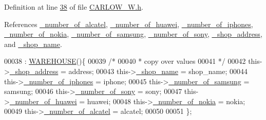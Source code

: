 Definition at line \hyperlink{_c_a_r_l_o_w___w_8h_source_l00038}{38} of file \hyperlink{_c_a_r_l_o_w___w_8h_source}{C\+A\+R\+L\+O\+W\+\_\+\+W.\+h}.



References \hyperlink{_c_a_r_l_o_w___w_8h_source_l00116}{\+\_\+number\+\_\+of\+\_\+alcatel}, \hyperlink{_c_a_r_l_o_w___w_8h_source_l00114}{\+\_\+number\+\_\+of\+\_\+huawei}, \hyperlink{_c_a_r_l_o_w___w_8h_source_l00111}{\+\_\+number\+\_\+of\+\_\+iphones}, \hyperlink{_c_a_r_l_o_w___w_8h_source_l00115}{\+\_\+number\+\_\+of\+\_\+nokia}, \hyperlink{_c_a_r_l_o_w___w_8h_source_l00112}{\+\_\+number\+\_\+of\+\_\+samsung}, \hyperlink{_c_a_r_l_o_w___w_8h_source_l00113}{\+\_\+number\+\_\+of\+\_\+sony}, \hyperlink{_c_a_r_l_o_w___w_8h_source_l00109}{\+\_\+shop\+\_\+address}, and \hyperlink{_c_a_r_l_o_w___w_8h_source_l00110}{\+\_\+shop\+\_\+name}.


\begin{DoxyCode}
00038                                                                                                            
                      : \hyperlink{class_w_a_r_e_h_o_u_s_e_a7a924d389af91f54ed0e1d1d8d56ec57_a7a924d389af91f54ed0e1d1d8d56ec57}{WAREHOUSE}()\{
00039         \textcolor{comment}{/*}
00040 \textcolor{comment}{         * copy over values
}
00041 \textcolor{comment}{         */}
00042         this->\hyperlink{class_c_a_r_l_o_w___w_acaa886b26f5a60d500f13709340d34cf_acaa886b26f5a60d500f13709340d34cf}{\_shop\_address} = address;
00043         this->\hyperlink{class_c_a_r_l_o_w___w_ad3ae4ca82f06287d8ad5bec07a43561a_ad3ae4ca82f06287d8ad5bec07a43561a}{\_shop\_name} = shop\_name;
00044         this->\hyperlink{class_c_a_r_l_o_w___w_aff9e9a986b6390d6fa51f52d43a8c0e8_aff9e9a986b6390d6fa51f52d43a8c0e8}{\_number\_of\_iphones} = iphone;
00045         this->\hyperlink{class_c_a_r_l_o_w___w_ae47f54289c630e38341ce8b2c8decf0f_ae47f54289c630e38341ce8b2c8decf0f}{\_number\_of\_samsung} = samsung;
00046         this->\hyperlink{class_c_a_r_l_o_w___w_a080de2e63290db84a0b9898682b74f6e_a080de2e63290db84a0b9898682b74f6e}{\_number\_of\_sony} = sony;
00047         this->\hyperlink{class_c_a_r_l_o_w___w_acc2837ed943bb51134e5878e818970fd_acc2837ed943bb51134e5878e818970fd}{\_number\_of\_huawei} = huawei;
00048         this->\hyperlink{class_c_a_r_l_o_w___w_ac4c7e47711cc4c9e0bc01fc37cabe7d1_ac4c7e47711cc4c9e0bc01fc37cabe7d1}{\_number\_of\_nokia} = nokia;
00049         this->\hyperlink{class_c_a_r_l_o_w___w_acf1f9888b2ac011cd0e8bb49b10abd91_acf1f9888b2ac011cd0e8bb49b10abd91}{\_number\_of\_alcatel} = alcatel;
00050         
00051     \};
\end{DoxyCode}
